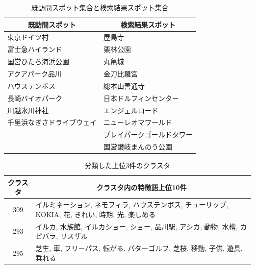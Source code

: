 \documentclass{deimj}
\begin{document}
\begin{table}[t]
    \caption{既訪問スポット集合と検索結果スポット集合}
    \label{table:既訪問スポット集合と検索結果スポット集合}
    \centering
    \begin{tabular}{l|l}
    \hline
    \multicolumn{1}{c|}{既訪問スポット} & \multicolumn{1}{c}{検索結果スポット} \\ \hline
    東京ドイツ村                       & 屋島寺                          \\
    富士急ハイランド                     & 栗林公園                         \\
    国営ひたち海浜公園                    & 丸亀城                          \\
    アクアパーク品川                     & 金刀比羅宮                        \\
    ハウステンボス                      & 総本山善通寺                       \\
    長崎バイオパーク                     & 日本ドルフィンセンター                  \\
    川越氷川神社                       & エンジェルロード                     \\
    千里浜なぎさドライブウェイ       & ニューレオマワールド                   \\
                                 & プレイパークゴールドタワー                \\
                                  & 国営讃岐まんのう公園 \\\hline
    \end{tabular}
\end{table}

\begin{table}[t]
    \caption{分類した上位3件のクラスタ}
    \label{table:分類した上位3件のクラスタ}
    \centering
    \begin{tabular}{c|l}
    \hline
    クラスタ & \multicolumn{1}{c}{クラスタ内の特徴語上位10件}                                      \\ \hline
    309    & イルミネーション, ネモフィラ, ハウステンボス, チューリップ, KOKIA, 花, きれい, 時期, 光, 楽しめる \\
    293    & イルカ, 水族館, イルカショー, ショー, 品川駅, アシカ, 動物, 水槽, カピバラ, リスザル          \\
    295    & 芝生, 車, フリーパス, 転がる, パターゴルフ, 芝桜, 移動, 子供, 遊具, 乗れる               \\ \hline
    \end{tabular}
\end{table}
\end{document}
